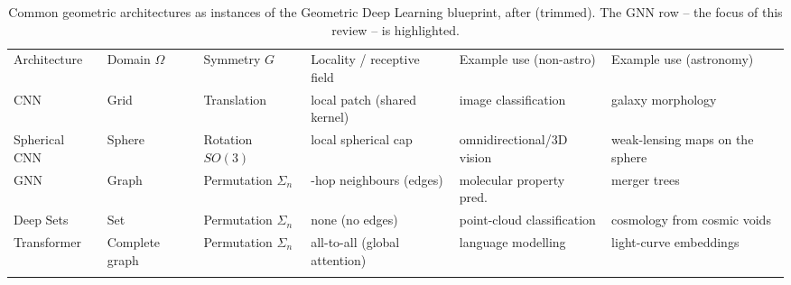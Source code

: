 \begin{table}
\caption{Common geometric architectures as instances of the Geometric Deep
Learning blueprint, after \citet{Bronstein2021_geometricDL_book} (trimmed). The
GNN row -- the focus of this review -- is highlighted.}
\label{tab:gdl_architectures}
\centering\footnotesize\setlength{\tabcolsep}{4pt}
\begin{tabular}{lll>{\raggedright\arraybackslash}p{2.4cm}>{\raggedright\arraybackslash}p{2.9cm}>{\raggedright\arraybackslash}p{3.1cm}}
\hline\noalign{\smallskip}
Architecture & Domain $\Omega$ & Symmetry $G$ & Locality / receptive field & Example use (non-astro) & Example use (astronomy) \\
\noalign{\smallskip}\svhline\noalign{\smallskip}
CNN           & Grid           & Translation            & local patch (shared kernel) & image classification \citep{Krizhevsky2012_alexnet_imagenet}        & galaxy morphology \citep{Dieleman2015_galaxymorphology_CNN} \\
Spherical CNN & Sphere         & Rotation $SO(3)$       & local spherical cap         & omnidirectional/3D vision \citep{Cohen2018_spherical_CNN}   & weak-lensing maps on the sphere \citep{Perraudin2019_deepsphere_spherical} \\
\rowcolor[HTML]{F3E9D6}
GNN           & Graph          & Permutation $\Sigma_n$ & 1-hop neighbours (edges)    & molecular property pred.\ \citep{Gilmer2017_MPNN_quantumchemistry}   & merger trees \citep{Jespersen2022_mangrove} \\
Deep Sets     & Set            & Permutation $\Sigma_n$ & none (no edges)             & point-cloud classification \citep{Zaheer2017_deepsets}  & cosmology from cosmic voids \citep{Cranmer2021_histpool_deepsets} \\
Transformer   & Complete graph & Permutation $\Sigma_n$ & all-to-all (global attention) & language modelling \citep{Vaswani2017_transformer_attention}        & light-curve embeddings \citep{DonosoOliva2023_astromer_transformer} \\
\noalign{\smallskip}\hline
\end{tabular}
\end{table}
